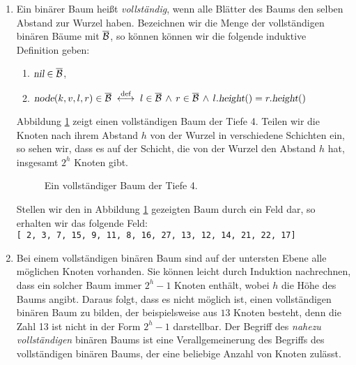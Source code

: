 \begin{enumerate}
\item Ein bin\"arer Baum hei{\ss}t \emph{vollst\"andig}, wenn alle Bl\"atter des Baums
      den selben Abstand zur Wurzel haben.  Bezeichnen wir die Menge der vollst\"andigen bin\"aren
      B\"aume mit $\overline{\mathcal{B}}$, so k\"onnen k\"onnen wir die folgende induktive Definition geben:
      \begin{enumerate}
      \item $\textsl{nil} \in \overline{\mathcal{B}}$,
      \item $\textsl{node}(k,v,l,r) \in \overline{\mathcal{B}} 
             \;\stackrel{\mbox{\scriptsize def}}{\longleftrightarrow}\;
             l \in \overline{\mathcal{B}} \,\wedge\, r \in \overline{\mathcal{B}} \,\wedge\,
             l.\textsl{height}() = r.\textsl{height}()$ 
      \end{enumerate}
      Abbildung \ref{fig:complete-tree.eps} zeigt einen vollst\"andigen Baum der Tiefe 4.
      Teilen wir die Knoten nach ihrem Abstand $h$ von der Wurzel in verschiedene
      Schichten ein, so sehen wir, dass es auf der Schicht, die von der Wurzel den Abstand
      $h$ hat, insgesamt $2^h$ Knoten gibt.

      \begin{figure}[!ht]
        \centering
        \caption{Ein vollst\"andiger Baum der Tiefe 4.}
        \label{fig:complete-tree.eps}
      \end{figure}

      Stellen wir den in Abbildung \ref{fig:complete-tree.eps} gezeigten Baum durch ein
      Feld dar, so erhalten wir das folgende Feld: 
      \\[0.2cm]
      \hspace*{1.3cm}
      \texttt{[ 2, 3, 7, 15, 9, 11, 8, 16, 27, 13, 12, 14, 21, 22, 17]}
\item Bei einem vollst\"andigen bin\"aren Baum sind auf der untersten Ebene 
      alle m\"oglichen Knoten vorhanden.  Sie k\"onnen leicht durch Induktion nachrechnen,
      dass ein solcher Baum immer $2^h - 1$ Knoten enth\"alt, wobei $h$ die H\"ohe des Baums angibt.
      Daraus folgt, dass es nicht m\"oglich ist, einen vollst\"andigen bin\"aren Baum zu bilden,
      der beispielsweise aus $13$ Knoten besteht, denn die Zahl 13 ist nicht in der Form
      $2^h - 1$ darstellbar.  Der Begriff des \emph{nahezu vollst\"andigen} bin\"aren Baums
      ist eine Verallgemeinerung des Begriffs des vollst\"andigen bin\"aren Baums, der 
      eine beliebige Anzahl von Knoten zul\"asst.


\end{enumerate}
